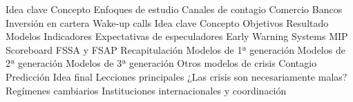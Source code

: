 \documentclass{nuevotema}
\begin{document}
\begin{esquema}[enumerate]
		\2 Idea clave
			\3 Concepto
			\3 Enfoques de estudio
		\2 Canales de contagio
			\3 Comercio
			\3 Bancos
			\3 Inversión en cartera
			\3 Wake-up calls
	\1 
		\2 Idea clave
			\3 Concepto
			\3 Objetivos
			\3 Resultado
		\2 Modelos
			\3 Indicadores
			\3 Expectativas de especuladores
			\3 Early Warning Systems
			\3 MIP Scoreboard
			\3 FSSA y FSAP
	\1[] 
		\2 Recapitulación
			\3 Modelos de 1ª generación
			\3 Modelos de 2ª generación
			\3 Modelos de 3ª generación
			\3 Otros modelos de crisis
			\3 Contagio
			\3 Predicción
		\2 Idea final
			\3 Lecciones principales
			\3 ¿Las crisis son necesariamente malas?
			\3 Regímenes cambiarios
			\3 Instituciones internacionales y coordinación

\end{esquema}

\esquemalargo
\end{document}

